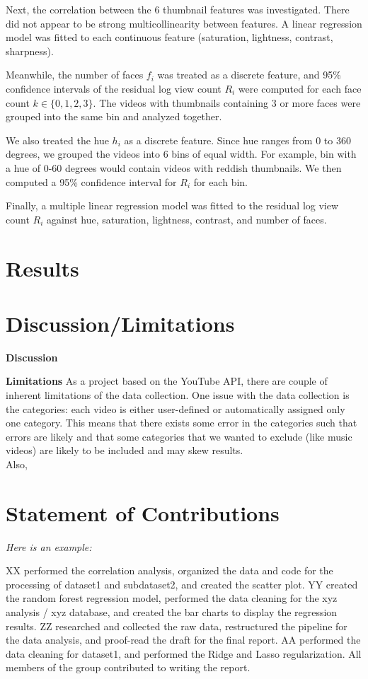 \documentclass{article}
\begin{document}
Next, the correlation between the 6 thumbnail features was investigated. There did not appear to be strong multicollinearity between features. A linear regression model was fitted to each continuous feature (saturation, lightness, contrast, sharpness).

Meanwhile, the number of faces $f_{i}$ was treated as a discrete feature, and 95\% confidence intervals of the residual log view count $R_{i}$ were computed for each face count $k\in\{0,1,2,3\}$. The videos with thumbnails containing 3 or more faces were grouped into the same bin and analyzed together.

We also treated the hue $h_{i}$ as a discrete feature. Since hue ranges from 0 to 360 degrees, we grouped the videos into 6 bins of equal width. For example, bin with a hue of 0-60 degrees would contain videos with reddish thumbnails. We then computed a 95\% confidence interval for $R_{i}$ for each bin.

Finally, a multiple linear regression model was fitted to the residual log view count $R_{i}$ against hue, saturation, lightness, contrast, and number of faces.

\section{Results}


\section{Discussion/Limitations}
\textbf{Discussion }

\textbf{Limitations } As a project based on the YouTube API, there are couple of inherent limitations of the data collection. One issue with the data collection is the categories: each video is either user-defined or automatically assigned only one category. This means that there exists some error in the categories such that errors are likely and that some categories that we wanted to exclude (like music videos) are likely to be included and may skew results. \\
Also, 


\section{Statement of Contributions}

\emph{Here is an example:}

XX performed the correlation analysis, organized the data and code for the processing of dataset1 and subdataset2, and created the scatter plot. 
YY created the random forest regression model, performed the data cleaning for the xyz analysis / xyz database, and created the bar charts to display the regression results. 
ZZ researched and collected the raw data, restructured the pipeline for the data analysis, and proof-read the draft for the final report. 
AA performed the data cleaning for dataset1, and performed the Ridge and Lasso regularization. 
All members of the group contributed to writing the report.




\end{document}
